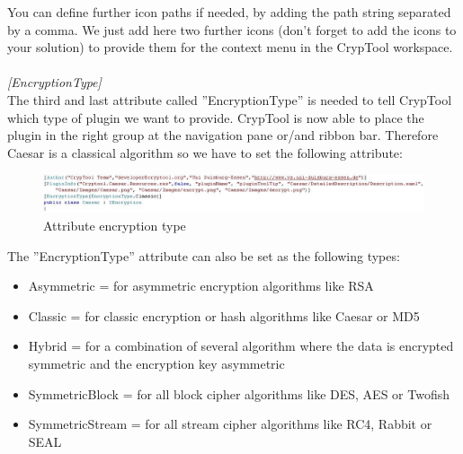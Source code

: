 You can define further icon paths if needed, by adding the path string separated by a comma. We just add here two further icons (don't forget to add the icons to your solution) to provide them for the context menu in the CrypTool workspace.\\\\
\textit{[EncryptionType]}\\
The third and last attribute called ''EncryptionType'' is needed to tell CrypTool which type of plugin we want to provide. CrypTool is now able to place the plugin in the right group at the navigation pane or/and ribbon bar. Therefore Caesar is a classical algorithm so we have to set the following attribute:
\begin{figure}[h]
	\centering
		\includegraphics[width=1.00\textwidth]{figures/attribute_encryption_type.JPG}
	\caption{Attribute encryption type}
	\label{fig:attribute_encryption_type}
\end{figure}

The ''EncryptionType'' attribute can also be set as the following types:
\begin{itemize}
	\item Asymmetric = for asymmetric encryption algorithms like RSA
	\item Classic = for classic encryption or hash algorithms like Caesar or MD5
	\item Hybrid = for a combination of several algorithm where the data is encrypted symmetric and the encryption key asymmetric
	\item SymmetricBlock = for all block cipher algorithms like DES, AES or Twofish
	\item SymmetricStream = for all stream cipher algorithms like RC4, Rabbit or SEAL
\end{itemize}


